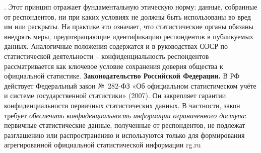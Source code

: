 . Этот принцип отражает фундаментальную этическую норму: данные, собранные от респондентов, ни при каких условиях не должны быть использованы во вред им или раскрыты. На практике это означает, что статистические органы обязаны внедрять меры, предотвращающие идентификацию респондентов в публикуемых данных. Аналогичные положения содержатся и в руководствах ОЭСР по статистической деятельности – конфиденциальность респондентов рассматривается как ключевое условие сохранения доверия общества к официальной статистике. \textbf{Законодательство Российской Федерации.} В РФ действует Федеральный закон № 282-ФЗ «Об официальном статистическом учёте и системе государственной статистики» (2007). Он закрепляет гарантии конфиденциальности первичных статистических данных. В частности, закон требует \textit{обеспечить конфиденциальность информации ограниченного доступа}: первичные статистические данные, полученные от респондентов, не подлежат разглашению или распространению и используются только для формирования агрегированной официальной статистической информации
rg.ru
